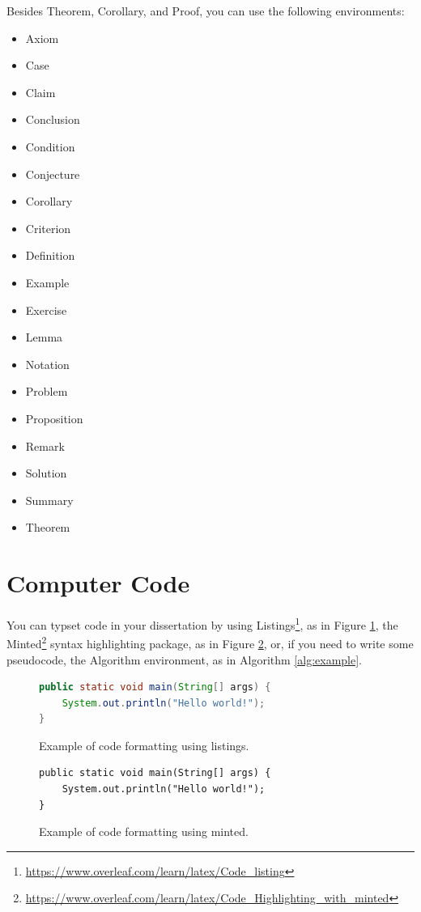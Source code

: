 \documentclass{dissertation}
\begin{document}
\noindent Besides Theorem, Corollary, and Proof, you can use the following environments:
\begin{itemize}
    \item Axiom
    \item Case
    \item Claim
    \item Conclusion
    \item Condition
    \item Conjecture
    \item Corollary
    \item Criterion
    \item Definition
    \item Example
    \item Exercise
    \item Lemma
    \item Notation
    \item Problem
    \item Proposition
    \item Remark
    \item Solution
    \item Summary
    \item Theorem
\end{itemize}

\section{Computer Code}

You can typset code in your dissertation by using Listings\footnote{\url{https://www.overleaf.com/learn/latex/Code_listing}}, as in Figure \ref{code:listings}, the Minted\footnote{\url{https://www.overleaf.com/learn/latex/Code_Highlighting_with_minted}} syntax highlighting package, as in Figure \ref{code:minted}, or, if you need to write some pseudocode, the Algorithm environment, as in Algorithm \ref{alg:example}.

\begin{figure}[h]
\begin{lstlisting}[language=Java]
public static void main(String[] args) {
    System.out.println("Hello world!");
}
\end{lstlisting}
\caption{Example of code formatting using listings.}\label{code:listings}
\end{figure}

\begin{figure}[h]
\begin{verbatim}
public static void main(String[] args) {
    System.out.println("Hello world!");
}
\end{verbatim}
\caption{Example of code formatting using minted.}\label{code:minted}
\end{figure}
\end{document}
